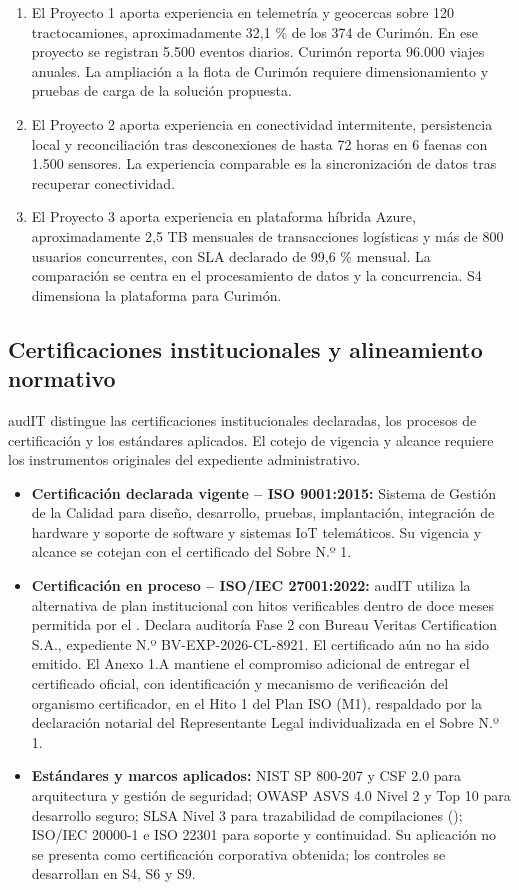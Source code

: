 \begin{enumerate}
  \item El Proyecto 1 aporta experiencia en telemetría y geocercas sobre 120 tractocamiones, aproximadamente 32,1 \% de los 374 de Curimón. En ese proyecto se registran 5.500 eventos diarios. Curimón reporta 96.000 viajes anuales. La ampliación a la flota de Curimón requiere dimensionamiento y pruebas de carga de la solución propuesta.
  \item El Proyecto 2 aporta experiencia en conectividad intermitente, persistencia local y reconciliación tras desconexiones de hasta 72 horas en 6 faenas con 1.500 sensores. La experiencia comparable es la sincronización de datos tras recuperar conectividad.
  \item El Proyecto 3 aporta experiencia en plataforma híbrida Azure, aproximadamente 2,5 TB mensuales de transacciones logísticas y más de 800 usuarios concurrentes, con SLA declarado de 99,6 \% mensual. La comparación se centra en el procesamiento de datos y la concurrencia. S4 dimensiona la plataforma para Curimón.
\end{enumerate}

\subsection{Certificaciones institucionales y alineamiento normativo}\label{sec:1-certificaciones}

audIT distingue las certificaciones institucionales declaradas, los procesos de certificación y los estándares aplicados. El cotejo de vigencia y alcance requiere los instrumentos originales del expediente administrativo.

\begin{itemize}
  \item \textbf{Certificación declarada vigente -- ISO 9001:2015:} Sistema de Gestión de la Calidad para diseño, desarrollo, pruebas, implantación, integración de hardware y soporte de software y sistemas IoT telemáticos. Su vigencia y alcance se cotejan con el certificado del Sobre N.º 1.
  \item \textbf{Certificación en proceso -- ISO/IEC 27001:2022:} audIT utiliza la alternativa de plan institucional con hitos verificables dentro de doce meses permitida por el . Declara auditoría Fase 2 con Bureau Veritas Certification S.A., expediente N.º BV-EXP-2026-CL-8921. El certificado aún no ha sido emitido. El Anexo 1.A mantiene el compromiso adicional de entregar el certificado oficial, con identificación y mecanismo de verificación del organismo certificador, en el Hito 1 del Plan ISO (M1), respaldado por la declaración notarial del Representante Legal individualizada en el Sobre N.º 1.
  \item \textbf{Estándares y marcos aplicados:} NIST SP 800-207 y CSF 2.0 para arquitectura y gestión de seguridad; OWASP ASVS 4.0 Nivel 2 y Top 10 para desarrollo seguro; SLSA Nivel 3 para trazabilidad de compilaciones (); ISO/IEC 20000-1 e ISO 22301 para soporte y continuidad. Su aplicación no se presenta como certificación corporativa obtenida; los controles se desarrollan en S4, S6 y S9.
\end{itemize}

